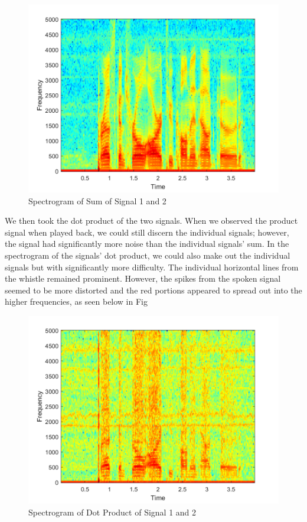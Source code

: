 \documentclass[10pt]{article}
\begin{document}
\begin{centering}
	\begin{figure} [H]
		\centering
		\includegraphics[scale=0.22]{images/combospecgram.png}
		\caption{Spectrogram of Sum of Signal 1 and 2}
		\label{fig:sum}
	\end{figure}
\end{centering}

We then took the dot product of the two signals. When we observed the product signal when played back, we could still discern the individual signals; however, the signal had significantly more noise than the individual signals' sum. In the spectrogram of the signals' dot product, we could also make out the individual signals but with significantly more difficulty. The individual horizontal lines from the whistle remained prominent. However, the spikes from the spoken signal seemed to be more distorted and the red portions appeared to spread out into the higher frequencies, as seen below in Fig

\begin{centering}
	\begin{figure} [H]
		\centering
		\includegraphics[scale=0.22]{images/multiplyspecgram.png}
		\caption{Spectrogram of Dot Product of Signal 1 and 2}
		\label{fig:multiply}
	\end{figure}
\end{centering}
\end{document}
